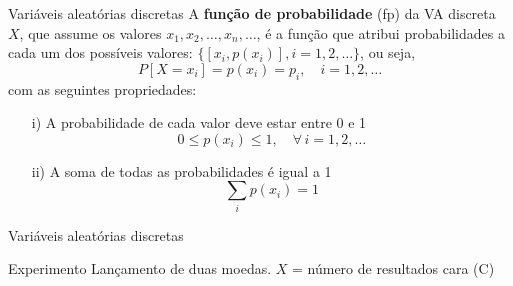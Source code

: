\documentclass[10pt]{beamer}\usepackage[]{graphicx}\usepackage[]{color}
\providecommand{\E}{\text{E}}
\providecommand{\Var}{\text{Var}}
\theoremstyle{definition}
\begin{document}
\begin{frame}[fragile=singleslide]{Variáveis aleatórias discretas}
  A \textbf{função de probabilidade} (fp) da VA discreta $X$, que assume
  os valores $x_1, x_2, \ldots, x_n, \ldots$, é a função que atribui
  probabilidades a cada um dos possíveis valores: $\{[x_i, p(x_i)], i =
  1, 2, \ldots\}$, ou seja,
  \begin{equation*}
    P[X = x_i] = p(x_i) = p_i, \quad i = 1, 2, \ldots
  \end{equation*}
  com as seguintes propriedades:
  \vspace{1em}
  \begin{itemize}
  \item[i)] A probabilidade de cada valor deve estar entre 0 e 1
    \begin{equation*}
      0 \leq p(x_i) \leq 1, \quad \forall \, i = 1, 2, \ldots
    \end{equation*}
  \item[ii)] A soma de todas as probabilidades é igual a 1
    \begin{equation*}
    \sum_{i} p(x_i) = 1
  \end{equation*}
  \end{itemize}
  \vspace{1em}
\end{frame}

\begin{frame}[fragile=singleslide]{Variáveis aleatórias discretas}
\begin{block}{Experimento}
Lançamento de duas moedas. $X$ = número de resultados cara (C)
\end{block}
\begin{center}
    
  \end{center}
\end{frame}
\end{document}
